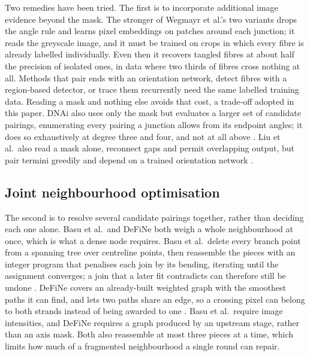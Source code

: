Two remedies have been tried. The first is to incorporate additional image
evidence beyond the mask. The stronger of Wegmayr et al.'s two variants drops the
angle rule and
learns pixel embeddings on patches around each junction; it reads the greyscale
image, and it must be trained on crops in which every fibre is already labelled
individually. Even then it recovers tangled fibres at about half the precision
of isolated ones, in data where two thirds of fibres cross nothing at all.
Methods that pair ends with an orientation network, detect fibres with a
region-based detector, or trace them recurrently
\citep{liu2019intersection,frei2020fiber,liu2023picktrace} need the same
labelled training data. Reading a mask and nothing else avoids that cost, a
trade-off adopted in this paper. DNAi also uses only the mask but evaluates a larger set of candidate
pairings, enumerating every pairing a junction allows from its endpoint
angles; it does
so exhaustively at degree three and four, and not at all above
\citep{playout2026dnai}. Liu et al.\ also read a mask alone, reconnect gaps and
permit overlapping output, but pair termini greedily and depend on a trained
orientation network \citep{liu2019intersection}.

\subsection{Joint neighbourhood optimisation}
\label{sec:rel-joint}

The second is to resolve several candidate pairings together, rather than
deciding each one alone. Basu et al.\ and
DeFiNe both weigh a whole neighbourhood at once, which is what a dense node
requires. Basu et al.\ delete every branch point from a spanning tree over
centreline points, then reassemble the pieces with an integer program that
penalises each join by its bending, iterating until the assignment
converges; a join that a later fit contradicts can therefore still be undone
\citep{basu2015extraction}. DeFiNe covers an already-built weighted graph with
the smoothest paths it can find, and lets two paths share an edge, so a
crossing pixel can belong to both strands instead of being awarded to one
\citep{breuer2015define}. Basu et al.\ require image intensities, and DeFiNe
requires a graph produced by an upstream stage, rather than an axis mask. Both
also reassemble at most three pieces at a time, which limits how much of a
fragmented neighbourhood a single round can repair.

